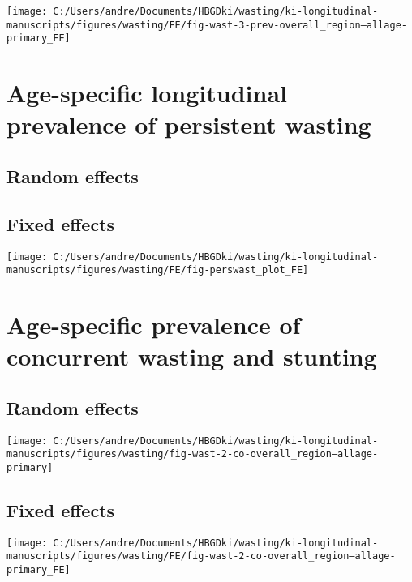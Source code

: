 \documentclass[
  9pt,
]{book}
\begin{document}
\texttt{[image: C:/Users/andre/Documents/HBGDki/wasting/ki-longitudinal-manuscripts/figures/wasting/FE/fig-wast-3-prev-overall\_region--allage-primary\_FE]}

\hypertarget{age-specific-longitudinal-prevalence-of-persistent-wasting}{%
\section{Age-specific longitudinal prevalence of persistent wasting}\label{age-specific-longitudinal-prevalence-of-persistent-wasting}}

\hypertarget{random-effects-5}{%
\subsection{Random effects}\label{random-effects-5}}

\hypertarget{fixed-effects-6}{%
\subsection{Fixed effects}\label{fixed-effects-6}}

\texttt{[image: C:/Users/andre/Documents/HBGDki/wasting/ki-longitudinal-manuscripts/figures/wasting/FE/fig-perswast\_plot\_FE]}

\hypertarget{age-specific-prevalence-of-concurrent-wasting-and-stunting}{%
\section{Age-specific prevalence of concurrent wasting and stunting}\label{age-specific-prevalence-of-concurrent-wasting-and-stunting}}

\hypertarget{random-effects-6}{%
\subsection{Random effects}\label{random-effects-6}}

\texttt{[image: C:/Users/andre/Documents/HBGDki/wasting/ki-longitudinal-manuscripts/figures/wasting/fig-wast-2-co-overall\_region--allage-primary]}

\hypertarget{fixed-effects-7}{%
\subsection{Fixed effects}\label{fixed-effects-7}}

\texttt{[image: C:/Users/andre/Documents/HBGDki/wasting/ki-longitudinal-manuscripts/figures/wasting/FE/fig-wast-2-co-overall\_region--allage-primary\_FE]}
\end{document}
